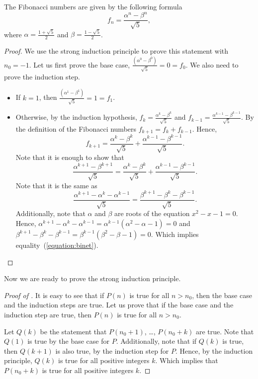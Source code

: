 \begin{theorem}
  The Fibonacci numbers are given by the following formula
  \[
      f_n = \frac{\alpha^n - \beta^n}{\sqrt{5}},
  \]
  where $\alpha = \frac{1 + \sqrt{5}}{2}$ and
  $\beta = \frac{1 - \sqrt{5}}{2}$.
\end{theorem}
\begin{proof}
  We use the strong induction principle to prove this statement with $n_0 = -1$.
  Let us first prove the base case,
  $\frac{(\alpha^0 - \beta^0)}{\sqrt{5}} = 0 = f_0$.
  We also need to prove the induction step.
  \begin{itemize}
    \item If $k = 1$, then $\frac{(\alpha^1 - \beta^1)}{\sqrt{5}} = 1 = f_1$.
    \item Otherwise, by the induction hypothesis,
      $f_k = \frac{\alpha^k - \beta^k}{\sqrt{5}}$ and
      $f_{k - 1} = \frac{\alpha^{k - 1} - \beta^{k - 1}}{\sqrt{5}}$.
      By the definition of the Fibonacci numbers $f_{k + 1} = f_k + f_{k - 1}$.
      Hence,
      \[
        f_{k + 1} = \frac{\alpha^k - \beta^k}{\sqrt{5}} +
        \frac{\alpha^{k - 1} - \beta^{k - 1}}{\sqrt{5}}.
      \]
      Note that it is enough to show that
      \begin{equation}
      \label{equation:binet}
        \frac{\alpha^{k + 1} - \beta^{k + 1}}{\sqrt{5}} =
        \frac{\alpha^k - \beta^k}{\sqrt{5}} +
        \frac{\alpha^{k - 1} - \beta^{k - 1}}{\sqrt{5}}.
      \end{equation}
      Note that it is the same as
      \[
        \frac{\alpha^{k + 1} - \alpha^k - \alpha^{k - 1}}{\sqrt{5}} =
        \frac{\beta^{k + 1} - \beta^k - \beta^{k - 1}}{\sqrt{5}}.
      \]
      Additionally, note that $\alpha$ and $\beta$ are roots of the equation
      $x^2 - x - 1 = 0$. Hence,
      $\alpha^{k + 1} - \alpha^k - \alpha^{k - 1} = \alpha^{k - 1}(\alpha^2 -
      \alpha - 1) = 0$ and
      $\beta^{k + 1} - \beta^k - \beta^{k - 1} =
      \beta^{k - 1}(\beta^2 - \beta - 1) = 0$. Which implies
      equality~(\ref{equation:binet}).
  \end{itemize}
\end{proof}

Now we are ready to prove the strong induction principle.
\begin{proof}[Proof of ]
  It is easy to see that if $P(n)$ is true for all $n > n_0$, then the base
  case and the induction steps are true. Let us prove that if the base case and
  the induction step are true, then $P(n)$ is true for all $n > n_0$.

  Let $Q(k)$ be the statement that $P(n_0 + 1)$, \dots, $P(n_0 + k)$ are true.
  Note that $Q(1)$ is true by the base case for $P$. Additionally, note that if
  $Q(k)$ is true, then $Q(k + 1)$ is also true, by the induction step for $P$.
  Hence, by the induction principle, $Q(k)$ is true for all positive integers
  $k$. Which implies that $P(n_0 + k)$ is true for all positive integers $k$.
\end{proof}

